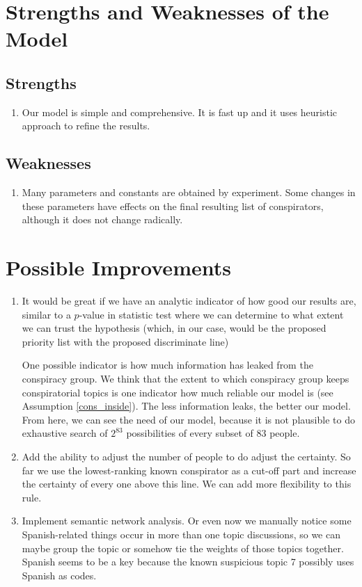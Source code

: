 \documentclass{icmmcm}
\begin{document}
\section{Strengths and Weaknesses of the Model}
\subsection{Strengths}
\begin{enumerate}
\item Our model is simple and comprehensive.
It is fast up and it uses heuristic approach
to refine the results.
\end{enumerate}
\subsection{Weaknesses}
\begin{enumerate}
\item Many parameters and constants are obtained
by experiment. Some changes in these parameters
have effects on the final resulting list
of conspirators, although it does not change
radically.
\end{enumerate}

\section{Possible Improvements}
\begin{enumerate}
\item It would be great if we have an analytic indicator of how good our results are, similar to a $p$-value in statistic
test where we can determine to what extent we can trust
the hypothesis (which, in our case, would be the 
proposed priority list with the proposed discriminate line)


One possible indicator is how much information has leaked from the conspiracy group. We think that the extent to which conspiracy group keeps conspiratorial topics is one indicator
how much reliable our model is (see Assumption \eqref{cons_inside}). 
The less information leaks, the better our model.
From here, we can see the need of our model, because
it is not plausible to do exhaustive search of
$2^{83}$ possibilities of every subset of $83$ people.

\item Add the ability to adjust the number of people to do 
adjust the certainty. So far we use the lowest-ranking known conspirator as a cut-off part and increase the certainty
of every one above this line. We can add more flexibility 
to this rule.

\item Implement semantic network analysis. 
	Or even now we manually notice some Spanish-related things occur in more than one topic discussions,
	so we can maybe group the topic or somehow tie the weights of those topics together. Spanish seems to be a key 
	because the known suspicious topic 7 possibly uses
	Spanish as codes.
\end{enumerate}
\end{document}
